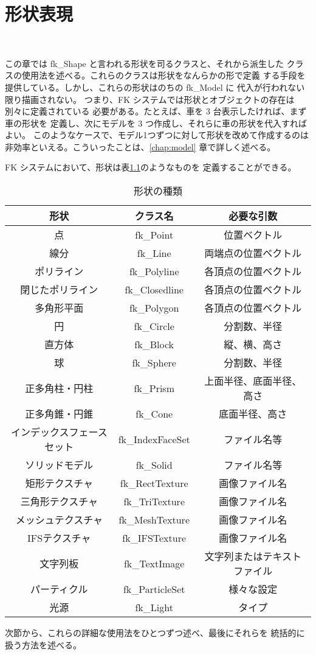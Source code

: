\chapter{形状表現} \label{chap:shape} ~

この章では fk\_Shape と言われる形状を司るクラスと、それから派生した
クラスの使用法を述べる。これらのクラスは形状をなんらかの形で定義
する手段を提供している。しかし、これらの形状はのちの fk\_Model に
代入が行われない限り描画されない。
つまり、FK システムでは形状とオブジェクトの存在は別々に定義されている
必要がある。たとえば、車を 3 台表示したければ、まず車の形状を
定義し、次にモデルを 3 つ作成し、それらに車の形状を代入すればよい。
このようなケースで、モデル1つずつに対して形状を改めて作成するのは
非効率といえる。こういったことは、\ref{chap:model} 章で詳しく述べる。

FK システムにおいて、形状は表\ref{tbl:fkShape1}のようなものを
定義することができる。

\begin{table}[H]
\caption{形状の種類}
\label{tbl:fkShape1}
\begin{center}
\begin{tabular}{|c|c|c|}
\hline
形状 & クラス名 & 必要な引数 \\ \hline \hline
点 & fk\_Point & 位置ベクトル \\ \hline
線分 & fk\_Line & 両端点の位置ベクトル \\ \hline
ポリライン & fk\_Polyline & 各頂点の位置ベクトル \\ \hline
閉じたポリライン & fk\_Closedline & 各頂点の位置ベクトル \\ \hline
多角形平面 & fk\_Polygon & 各頂点の位置ベクトル \\ \hline
円 & fk\_Circle & 分割数、半径 \\ \hline
直方体 & fk\_Block & 縦、横、高さ \\ \hline
球 & fk\_Sphere & 分割数、半径 \\ \hline
正多角柱・円柱 & fk\_Prism & 上面半径、底面半径、高さ \\ \hline
正多角錐・円錐 & fk\_Cone & 底面半径、高さ \\ \hline
インデックスフェースセット & fk\_IndexFaceSet & ファイル名等 \\ \hline
ソリッドモデル & fk\_Solid & ファイル名等 \\ \hline
矩形テクスチャ & fk\_RectTexture & 画像ファイル名 \\ \hline
三角形テクスチャ & fk\_TriTexture & 画像ファイル名 \\ \hline
メッシュテクスチャ & fk\_MeshTexture & 画像ファイル名 \\ \hline
IFSテクスチャ & fk\_IFSTexture & 画像ファイル名 \\ \hline
文字列板 & fk\_TextImage & 文字列またはテキストファイル \\ \hline
パーティクル & fk\_ParticleSet & 様々な設定 \\ \hline
光源 & fk\_Light & タイプ \\ \hline
\end{tabular}
\end{center}
\end{table}
次節から、これらの詳細な使用法をひとつずつ述べ、最後にそれらを
統括的に扱う方法を述べる。
